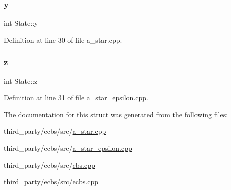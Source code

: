 \mbox{\label{struct_state_a5dcf4a949618c21b85eb39ad41dfb08e}} 
\subsubsection{\texorpdfstring{y}{y}}
{\footnotesize\ttfamily int State\+::y}



Definition at line 30 of file a\+\_\+star.\+cpp.

\mbox{\label{struct_state_afbfffdf9a289cde788f99498adf1a0e5}} 
\subsubsection{\texorpdfstring{z}{z}}
{\footnotesize\ttfamily int State\+::z}



Definition at line 31 of file a\+\_\+star\+\_\+epsilon.\+cpp.



The documentation for this struct was generated from the following files\+:\begin{DoxyCompactItemize}
\item 
third\+\_\+party/ecbs/src/\hyperlink{a__star_8cpp}{a\+\_\+star.\+cpp}\item 
third\+\_\+party/ecbs/src/\hyperlink{a__star__epsilon_8cpp}{a\+\_\+star\+\_\+epsilon.\+cpp}\item 
third\+\_\+party/ecbs/src/\hyperlink{cbs_8cpp}{cbs.\+cpp}\item 
third\+\_\+party/ecbs/src/\hyperlink{ecbs_8cpp}{ecbs.\+cpp}\end{DoxyCompactItemize}
